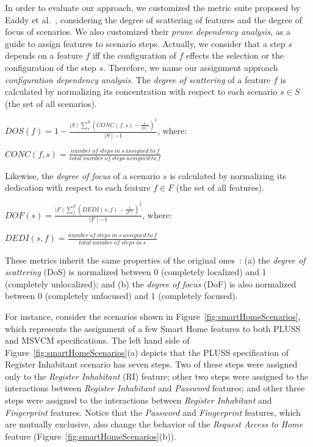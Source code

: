 \documentclass{sig-alternate}
\begin{document}
In order to evaluate our approach, we customized the metric suite proposed by Eaddy et al.~\cite{Eaddy:2007aa},
considering the degree of scattering of features and the degree of focus of scenarios. We also customized their \emph{prune dependency analysis}, as a guide to
assign features to scenario steps. Actually, we consider that a step $s$ depends on a feature $f$ iff the configuration of $f$ effects the selection or the configuration of the step $s$. Therefore, we name our assignment approach
\emph{configuration dependency analysis}.  The \emph{degree of scattering} of a
feature $f$ is calculated by normalizing its concentration with respect to each
scenario $s \in S$ (the set of all scenarios).



%

\begin{center}
$DOS(f) = 1 - \frac{\mid S \mid \sum_{s}^{S}(CONC(f,s)-\frac{1}{\mid S
\mid})^2}{\mid S \mid -1}$, where:

$CONC(f,s) = \frac{number\ of\ steps\ in\ s\ assigned\ to\ f}{total\ number\
of\ steps\ assigned\ to\ f}$
\end{center}

Likewise, the \emph{degree of focus} of a scenario $s$ is calculated by
normalizing its dedication with respect to each feature $f \in F$ (the set of
all features).

\begin{center}
$DOF(s) = \frac{\mid F \mid \sum_{f}^{F}(DEDI(s,f)-\frac{1}{\mid F
\mid})^2}{\mid F \mid -1}$, where:

$DEDI(s,f) = \frac{number\ of\ steps\ in\ s\ assigned\ to\ f}{total\ number\
of\ steps\ in\ s}$
\end{center}

These metrics inherit the same properties of the original
ones~\cite{Eaddy:2007aa}: (a) the
\emph{degree of scattering} (DoS) is normalized between 0 (completely localized)
and 1 (completely unlocalized); and (b) the \emph{degree of focus} (DoF) is also
normalized between 0 (completely unfocused) and 1 (completely focused).


For instance, consider the scenarios shown in
Figure~\ref{fig:smartHomeScenarios}, which represents the assignment of a few Smart Home features to 
both PLUSS and MSVCM specifications. The left hand side of
Figure~\ref{fig:smartHomeScenarios}(a) depicts that the PLUSS specification of
Register Inhabitant scenario has seven steps. Two of these steps were assigned only to the \emph{Register Inhabitant} (RI) feature; other two steps
were assigned to the interactions between \emph{Register Inhabitant} and
\emph{Password} features; and other three steps were assigned to the
interactions between \emph{Register Inhabitant} and \emph{Fingerprint}
features. Notice that the \emph{Password} and \emph{Fingerprint} features, which
are mutually exclusive, also change the behavior of the \emph{Request Access to
Home} feature (Figure~\ref{fig:smartHomeScenarios}(b)).
\end{document}
